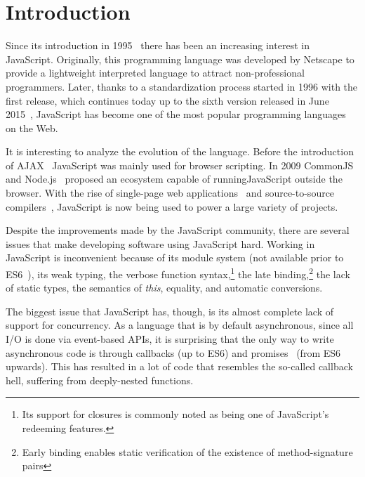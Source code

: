 \documentclass{sig-alternate}
\begin{document}



\section{Introduction}

Since its introduction in 1995~\cite{web:js} there has been an increasing interest in JavaScript. Originally, this programming language was developed by Netscape to provide a lightweight interpreted language to attract non-professional programmers. Later, thanks to a standardization process started in 1996 with the first release, which continues today up to the sixth version released in June 2015~\cite{web:ecmascript6}, JavaScript has become one of the most popular programming languages on the Web.

It is interesting to analyze the evolution of the language. Before the introduction of AJAX~\cite{web:ajax} JavaScript was mainly used for browser scripting. In 2009 CommonJS~\cite{web:commonjs} and Node.js~\cite{web:nodejs} proposed an ecosystem capable of running\newline JavaScript outside the browser. With the rise of single-page web applications~\cite{web:spa} and source-to-source compilers~\cite{web:compile2js}, JavaScript is now being used to power a large variety of projects. 

Despite the improvements made by the JavaScript community, there are several issues that make developing software using JavaScript hard. Working in JavaScript is inconvenient because of its module system (not available prior to ES6~\cite{web:es6modules}), its weak typing, the verbose function syntax,\footnote{Its support for closures is commonly noted as being one of JavaScript\rq{s} redeeming features.} the late binding,\footnote{Early binding enables static verification of the existence of method-signature pairs} the lack of static types, the semantics of \emph{this}, equality, and automatic conversions.

The biggest issue that JavaScript has, though, is its almost complete lack of support for concurrency. As a language that is by default asynchronous, since all I/O is done via event-based APIs, it is surprising that the only way to write asynchronous code is through callbacks (up to ES6) and promises~\cite{LiskovS88} (from ES6 upwards). This has resulted in a lot of code that resembles the so-called callback hell, suffering from deeply-nested functions.
\end{document}
